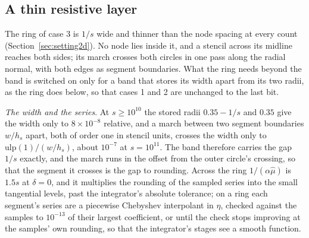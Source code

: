 \documentclass[11pt]{amsart}
\theoremstyle{definition}
\theoremstyle{remark}
\newcommand{\para}[1]{\par\smallskip\noindent\textit{#1}.\enspace}
\newcommand{\sci}[2]{#1 \times 10^{#2}}
\begin{document}
\subsection{A thin resistive layer}
\label{sec:ring}
The ring of case 3 is $1/s$ wide and thinner than the node spacing at every
count (Section~\ref{sec:setting2d}). No node lies inside it, and a stencil
across its midline reaches both sides; its march crosses both circles in
one pass along the radial normal, with both edges as segment boundaries.
What the ring needs beyond the band is switched on only for a band that
stores its width apart from its two radii, as the ring does below, so that
cases 1 and 2 are unchanged to the last bit.

\para{The width and the series}
At $s \ge 10^{10}$ the stored radii $0.35 - 1/s$ and $0.35$ give the width
only to $\sci{8}{-8}$ relative, and a march between two segment boundaries
$w / h_s$ apart, both of order one in stencil units, crosses the width only
to $\mathrm{ulp}(1) / (w / h_s)$, about $10^{-7}$ at $s = 10^{11}$. The
band therefore carries the gap $1/s$ exactly, and the march runs in the
offset from the outer circle's crossing, so that the segment it crosses is
the gap to rounding. Across the ring $1 / (\alpha \hat\mu)$ is $1.5 s$ at
$\delta = 0$, and it multiplies the rounding of the sampled series into the
small tangential levels, past the integrator's absolute tolerance; on a
ring each segment's series are a piecewise Chebyshev interpolant in $\eta$,
checked against the samples to $10^{-13}$ of their largest coefficient, or
until the check stops improving at the samples' own rounding, so
that the integrator's stages see a smooth function.
\end{document}
